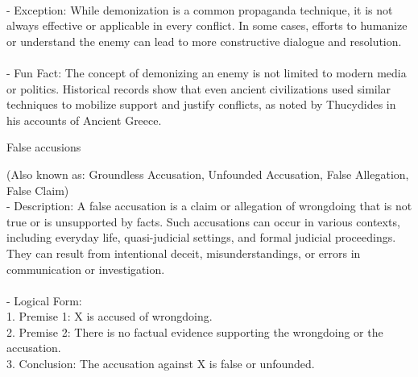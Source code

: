 \documentclass[a4paper,12pt,single,pdftex]{scrartcl}
\begin{document}
{    
      
    \\

    
      - Exception: While demonization is a common propaganda technique, it is not always effective or applicable in every conflict. In some cases, efforts to humanize or understand the enemy can lead to more constructive dialogue and resolution.
    \\

    
      
    \\

    
      - Fun Fact: The concept of demonizing an enemy is not limited to modern media or politics. Historical records show that even ancient civilizations used similar techniques to mobilize support and justify conflicts, as noted by Thucydides in his accounts of Ancient Greece.
    \\

  }


False accusions
    
      (Also known as: Groundless Accusation, Unfounded Accusation, False Allegation, False Claim)
    \\

  
    
      - Description: A false accusation is a claim or allegation of wrongdoing that is not true or is unsupported by facts. Such accusations can occur in various contexts, including everyday life, quasi-judicial settings, and formal judicial proceedings. They can result from intentional deceit, misunderstandings, or errors in communication or investigation.
    \\

    
      
    \\

    
      - Logical Form:
    \\

    
        1. Premise 1: X is accused of wrongdoing.
    \\

    
        2. Premise 2: There is no factual evidence supporting the wrongdoing or the accusation.
    \\

    
        3. Conclusion: The accusation against X is false or unfounded.
    \\

    
      
    \\
\end{document}
